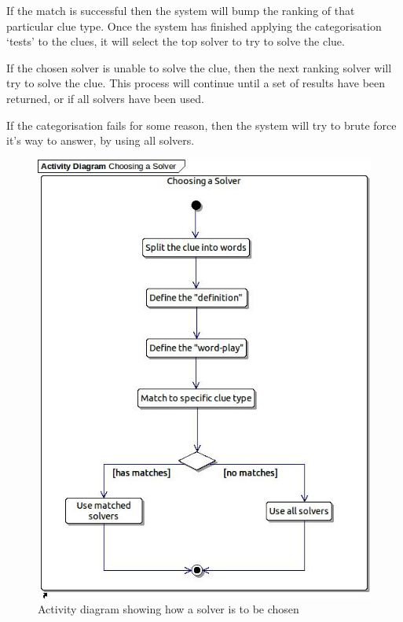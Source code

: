 If the match is successful then the system will bump the ranking of that 
particular clue type. Once the system has finished applying the categorisation 
`tests' to the clues, it will select the top solver to try to solve the clue.

If the chosen solver is unable to solve the clue, then the next ranking solver 
will try to solve the clue. This process will continue until a set of results 
have been returned, or if all solvers have been used.

If the categorisation fails for some reason, then the system will try to brute 
force it's way to answer, by using all solvers.

\begin{figure}[H]
  \centering
  \includegraphics[scale=0.6]{activity/choosing_a_solver.jpg}
  \caption{Activity diagram showing how a solver is to be chosen}
  \label{fig:categorisation_activity}
\end{figure}


